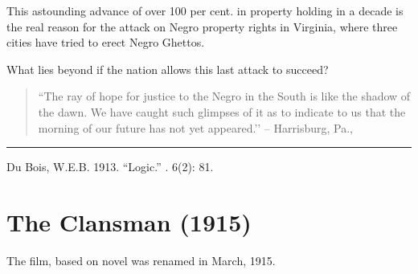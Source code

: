 \documentclass[letterpaper,10pt,english]{jupyterBook}
\begin{document}
\sphinxAtStartPar
This astounding advance of over 100 per cent. in property holding in a decade is the real reason for the attack on Negro property rights in Virginia, where three cities have tried to erect Negro Ghettos.

\sphinxAtStartPar
What lies beyond if the nation allows this last attack to succeed?
\begin{quote}

\sphinxAtStartPar
“The ray of hope for justice to the Negro in the South is like the shadow of the dawn. We have caught such glimpses of it as to indicate to us that the morning of our future has not yet appeared.’’
– Harrisburg, Pa., 
\end{quote}


\bigskip\hrule\bigskip


\sphinxAtStartPar
{} Du Bois, W.E.B. 1913. “Logic.” . 6(2): 81.


\section{The Clansman (1915)}
\label{\detokenize{Volumes/10/01/clansman:the-clansman-1915}}\label{\detokenize{Volumes/10/01/clansman::doc}}
\begin{sphinxShadowBox}
\sphinxstylesidebartitle{}

\sphinxAtStartPar
The film, based on  novel  was renamed  in March, 1915.
\end{sphinxShadowBox}
\end{document}
